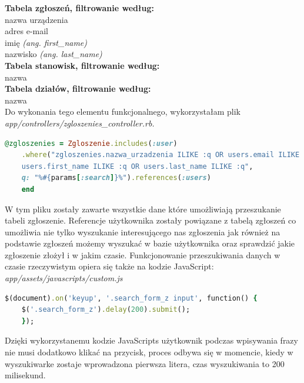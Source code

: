 \documentclass[openright]{xmgr}
\begin{document}
	\textbf{Tabela zgłoszeń, filtrowanie według:}\\
	\textendash\space nazwa urządzenia\\
	\textendash\space adres e-mail\\
	\textendash\space imię
	\textit{(ang. first\_name)}\\
	\textendash\space nazwisko
	\textit{(ang. last\_name)}\\
	
	\textbf{Tabela stanowisk, filtrowanie według:}\\
	\textendash\space nazwa\\
	
	\textbf{Tabela działów, filtrowanie według:}\\
	\textendash\space nazwa\\
	
	Do wykonania tego elementu funkcjonalnego, wykorzystałam plik\\
	\textit{app/controllers/zgloszenies\_controller.rb.}
	
	\begin{lstlisting}[language=Ruby,lineskip={-1pt},caption=Dane według których nastepuje przeszukiwanie]
	@zgloszenies = Zgloszenie.includes(:user)
	.where("zgloszenies.nazwa_urzadzenia ILIKE :q OR users.email ILIKE :q OR 
	users.first_name ILIKE :q OR users.last_name ILIKE :q", 
	q: "%#{params[:search]}%").references(:users)
	end
	\end{lstlisting}
	
	W tym pliku zostały zawarte wszystkie dane które umożliwiają przeszukanie tabeli zgłoszenie. Referencje użytkownika zostały powiązane z tabelą zgłoszeń co umożliwia nie tylko wyszukanie interesującego nas zgłoszenia jak również na podstawie zgłoszeń możemy wyszukać w bazie użytkownika oraz sprawdzić jakie zgłoszenie złożył i w jakim czasie.
	Funkcjonowanie przeszukiwania danych w czasie rzeczywistym opiera się także na kodzie JavaScript:\\
	
	\textit{app/assets/javascripts/custom.js}
	\begin{lstlisting}[language=Ruby,lineskip={-1pt},caption=JavaScripts - przeszukiwanie w czasie rzeczywistym]
	$(document).on('keyup', '.search_form_z input', function() {
	$('.search_form_z').delay(200).submit();
	});
	\end{lstlisting}
	
	Dzięki wykorzystanemu kodzie JavaScripts użytkownik podczas wpisywania frazy nie musi dodatkowo klikać na przycisk, proces odbywa się w momencie, kiedy w wyszukiwarke zostaje wprowadzona pierwsza litera, czas wyszukiwania to 200 milisekund. 
	\newpage
\end{document}
